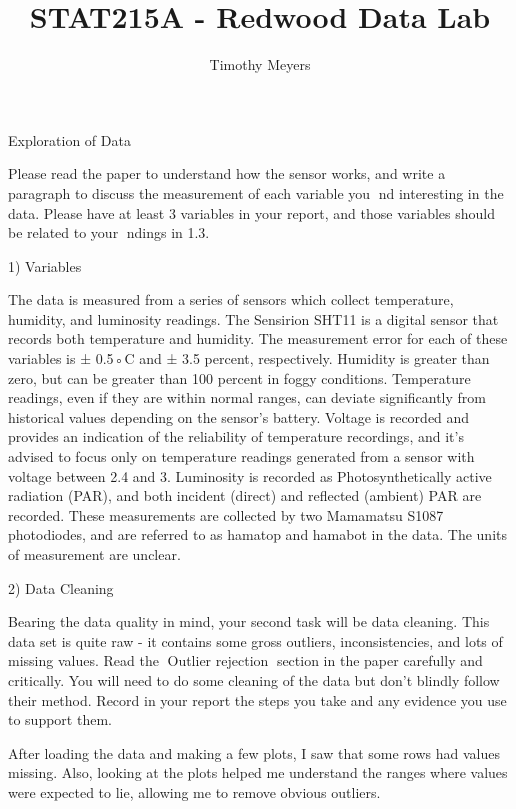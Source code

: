 \documentclass{article}\usepackage[]{graphicx}\usepackage[]{color}
\begin{document}
\title{STAT215A - Redwood Data Lab}
\author{Timothy Meyers}
\maketitle



Exploration of Data

Please read the paper to understand how the sensor works, and write a paragraph to discuss the measurement of each variable you 􏰃nd interesting in the data. Please have at least 3 variables in your report, and those variables should be related to your 􏰃ndings in 1.3.

1) Variables

The data is measured from a series of sensors which collect temperature, humidity, and luminosity readings.  The Sensirion SHT11 is a digital sensor that records both temperature and humidity.  The measurement error for each of these variables is ± 0.5◦C and ± 3.5 percent, respectively.  Humidity is greater than zero, but can be greater than 100 percent in foggy conditions. Temperature readings, even if they are within normal ranges, can deviate significantly from historical values depending on the sensor's battery.  Voltage is recorded and provides an indication of the reliability of temperature recordings, and it's advised to focus only on temperature readings generated from a sensor with voltage between 2.4 and 3.  Luminosity is recorded as Photosynthetically active radiation (PAR), and both incident (direct) and reflected (ambient) PAR are recorded.  These measurements are collected by two Mamamatsu S1087 photodiodes, and are referred to as hamatop and hamabot in the data.  The units of measurement are unclear.

2) Data Cleaning

Bearing the data quality in mind, your second task will be data cleaning. This data set is quite raw - it contains some gross outliers, inconsistencies, and lots of missing values. Read the 􏰅Outlier rejection􏰆 section in the paper carefully and critically. You will need to do some cleaning of the data but don't blindly follow their method. Record in your report the steps you take and any evidence you use to support them.

After loading the data and making a few plots, I saw that some rows had values missing.  Also, looking at the plots helped me understand the ranges where values were expected to lie, allowing me to remove obvious outliers.
\end{document}
